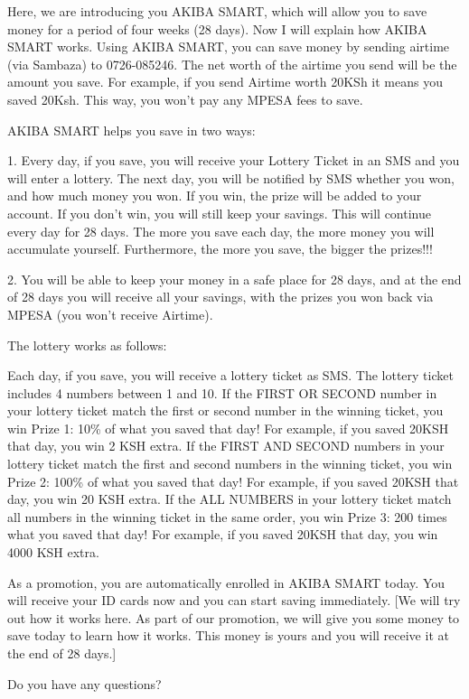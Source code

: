 \documentclass[11pt]{article}
\begin{document}
            {\setlength{\parskip}{1em} \setlength{\parindent}{0em}

            Here, we are introducing you AKIBA SMART, which will allow you to save money for a period of four weeks (28 days). Now I will explain how AKIBA SMART works. Using AKIBA SMART, you can save money by sending airtime (via Sambaza) to 0726-085246. The net worth of the airtime you send will be the amount you save. For example, if you send Airtime worth 20KSh it means you saved 20Ksh. This way, you won't pay any MPESA fees to save.

            AKIBA SMART helps you save in two ways:

            1. Every day, if you save, you will receive your Lottery Ticket in an SMS and you will enter a lottery. The next day, you will be notified by SMS whether you won, and how much money you won. If you win, the prize will be added to your account. If you don't win, you will still keep your savings. This will continue every day for 28 days. The more you save each day, the more money you will accumulate yourself. Furthermore, the more you save, the bigger the prizes!!!

            2. You will be able to keep your money in a safe place for 28 days, and at the end of 28 days you will receive all your savings, with the prizes you won back via MPESA (you won't receive Airtime).

            The lottery works as follows:

            Each day, if you save, you will receive a lottery ticket as SMS. The lottery ticket includes 4 numbers between 1 and 10. If the FIRST OR SECOND number in your lottery ticket match the first or second number in the winning ticket, you win Prize 1: 10\% of what you saved that day! For example, if you saved 20KSH that day, you win 2 KSH extra. If the FIRST AND SECOND numbers in your lottery ticket match the first and second numbers in the winning ticket, you win Prize 2: 100\% of what you saved that day! For example, if you saved 20KSH that day, you win 20 KSH extra. If the ALL NUMBERS in your lottery ticket match all numbers in the winning ticket in the same order, you win Prize 3: 200 times what you saved that day! For example, if you saved 20KSH that day, you win 4000 KSH extra.

            As a promotion, you are automatically enrolled in AKIBA SMART today. You will receive your ID cards now and you can start saving immediately. [We will try out how it works here. As part of our promotion, we will give you some money to save today to learn how it works. This money is yours and you will receive it at the end of 28 days.]

            Do you have any questions?

            }
\end{document}
